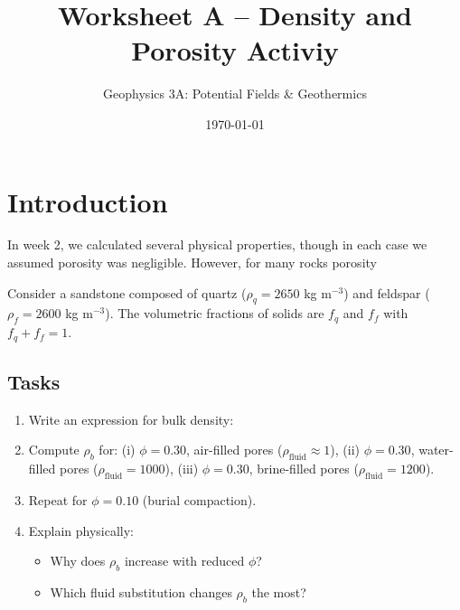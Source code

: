 \documentclass[11pt,a4paper]{article}
\title{Worksheet A -- Density and Porosity Activiy}
\author{Geophysics 3A: Potential Fields \& Geothermics}
\date{\today}
\begin{document}
\section*{Introduction}
In week 2, we calculated several physical properties, though in each case we assumed porosity was negligible.  However, for many rocks porosity

Consider a sandstone composed of quartz ($\rho_q=2650$ kg m$^{-3}$) and feldspar ($\rho_f=2600$ kg m$^{-3}$).
The volumetric fractions of solids are $f_q$ and $f_f$ with $f_q + f_f = 1$.

\subsection*{Tasks}
\begin{enumerate}
  \item Write an expression for bulk density:

  \item Compute $\rho_b$ for:  
        (i) $\phi = 0.30$, air-filled pores ($\rho_{\text{fluid}}\approx 1$),  
        (ii) $\phi = 0.30$, water-filled pores ($\rho_{\text{fluid}}=1000$),  
        (iii) $\phi = 0.30$, brine-filled pores ($\rho_{\text{fluid}}=1200$).

  \item Repeat for $\phi = 0.10$ (burial compaction).

  \item Explain physically:  
        \begin{itemize}
          \item Why does $\rho_b$ increase with reduced $\phi$?  
          \item Which fluid substitution changes $\rho_b$ the most?  
        \end{itemize}
\end{enumerate}
\end{document}
